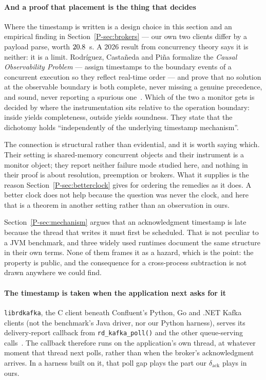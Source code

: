 \documentclass[10pt,journal,onecolumn]{IEEEtran}
\newcommand{\kafka}{Kafka}
\newcommand{\mainModeA}{\ref{P-sec:mechanism}}             %
\newcommand{\mainBrokers}{\ref{P-sec:brokers}}        %
\newcommand{\mainBetterClock}{\ref{P-sec:betterclock}}    %
\begin{document}
\paragraph{And a proof that placement is the thing that decides}
Where the timestamp is written is a design choice in this section and an empirical
finding in Section~\mainBrokers{} --- our own two clients differ by a payload parse, worth
$20.8$~\textmu s. A 2026 result from concurrency theory says it is
neither: it is a
limit. Rodr\'iguez, Casta\~neda and Pi\~na formalize the \emph{Causal Observability
Problem} --- assign timestamps to the boundary events of a concurrent execution so they
reflect real-time order --- and prove that no solution at the observable boundary is both
complete, never missing a genuine precedence, and sound, never reporting a spurious
one~\cite{rodriguez2026causal}. Which of the two a monitor gets is decided by where the
instrumentation sits relative to the operation boundary: inside yields completeness,
outside yields soundness. They state that the dichotomy holds ``independently of the
underlying timestamp mechanism''.

The connection is structural rather than evidential, and it is worth saying which. Their
setting is shared-memory concurrent objects and their instrument is a monitor object;
they report neither failure mode studied here, and nothing in their proof is about
resolution, preemption or brokers. What it supplies is the reason Section~\mainBetterClock{}
gives for ordering the remedies as it does. A better clock does not help because the
question was never the clock, and here that is a theorem in another setting rather than
an observation in ours.

Section~\mainModeA{} argues that an acknowledgment timestamp is late because the thread that writes it must
first be scheduled. That is not peculiar to a JVM benchmark, and three widely used runtimes
document the same structure in their own terms. None of them frames it as a hazard, which is
the point: the property is public, and the consequence for a cross-process subtraction is not
drawn anywhere we could find.

\paragraph{The timestamp is taken when the application next asks for it}
\texttt{librdkafka}, the C client beneath Confluent's Python, Go and .NET \kafka{} clients (not
the benchmark's Java driver, nor our Python harness), serves its delivery-report callback from
\texttt{rd\_kafka\_poll()} and the other queue-serving calls~\cite{librdkafka}. The callback
therefore runs on the application's own thread, at whatever moment that thread next polls,
rather than when the broker's acknowledgment arrives. In a harness built on it, that poll gap
plays the part our $\delta_{\mathrm{ack}}$ plays in ours.
\end{document}
